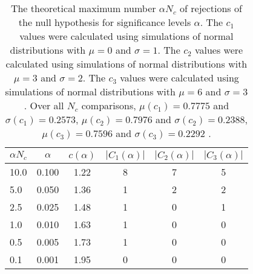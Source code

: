 \begin{table}[h!]
\begin{center}
\begin{tabular}{| l | c | c | c | c | c |}\hline
$\alpha N_c$ & $\alpha$ & $c(\alpha)$ & $|C_1(\alpha)|$ & $|C_2(\alpha)|$ & $|C_3(\alpha)|$ \\\hline
10.0 & 0.100 & 1.22 & 8 & 7 & 5 \\\hline
5.0 & 0.050 & 1.36 & 1 & 2 & 2 \\\hline
2.5 & 0.025 & 1.48 & 1 & 0 & 1 \\\hline
1.0 & 0.010 & 1.63 & 1 & 0 & 0 \\\hline
0.5 & 0.005 & 1.73 & 1 & 0 & 0 \\\hline
0.1 & 0.001 & 1.95 & 0 & 0 & 0 \\\hline
\end{tabular}
\caption{The theoretical maximum number $\alpha N_c$ of rejections
        of the null hypothesis for significance levels $\alpha$.
        The $c_1$ values were calculated using simulations of normal distributions with $\mu=0$ and $\sigma=1$.
        The $c_2$ values were calculated using simulations of normal distributions with $\mu=3$ and $\sigma=2$.
        The $c_3$ values were calculated using simulations of normal distributions with $\mu=6$ and $\sigma=3$.
        Over all $N_c$ comparisons,
         $\mu(c_1)=0.7775$ and $\sigma(c_1)=0.2573$,
         $\mu(c_2)=0.7976$ and $\sigma(c_2)=0.2388$,
         $\mu(c_3)=0.7596$ and $\sigma(c_3)=0.2292$ .
        }
\end{center}
\end{table}